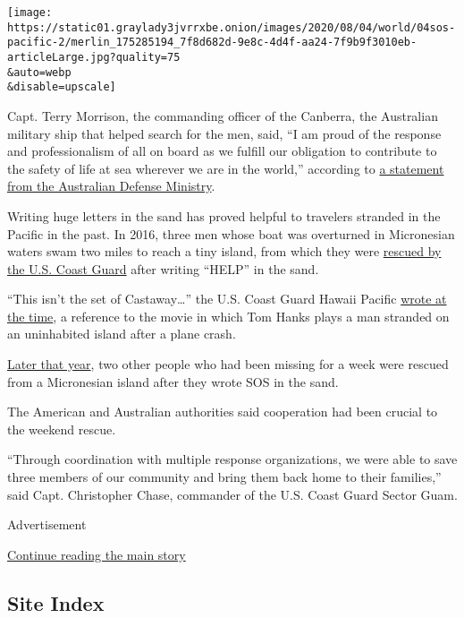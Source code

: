 \texttt{[image: https://static01.graylady3jvrrxbe.onion/images/2020/08/04/world/04sos-pacific-2/merlin\_175285194\_7f8d682d-9e8c-4d4f-aa24-7f9b9f3010eb-articleLarge.jpg?quality=75\\\&auto=webp\\\&disable=upscale]}

Capt. Terry Morrison, the commanding officer of the Canberra, the
Australian military ship that helped search for the men, said, ``I am
proud of the response and professionalism of all on board as we fulfill
our obligation to contribute to the safety of life at sea wherever we
are in the world,'' according to
\href{https://news.defence.gov.au/international/hmas-canberra-assists-search-and-rescue}{a
statement from the Australian Defense Ministry}.

Writing huge letters in the sand has proved helpful to travelers
stranded in the Pacific in the past. In 2016, three men whose boat was
overturned in Micronesian waters swam two miles to reach a tiny island,
from which they were
\href{https://twitter.com/USCGHawaiiPac/status/718703857837019137?ref_src=twsrc\%5Etfw\%7Ctwcamp\%5Etweetembed\%7Ctwterm\%5E718703857837019137\%7Ctwgr\%5E\&ref_url=https\%3A\%2F\%2Fwww.theguardian.com\%2Fus-news\%2F2016\%2Fapr\%2F09\%2Fmen-rescued-help-palm-leaves-island-pacific}{rescued
by the U.S. Coast Guard} after writing ``HELP'' in the sand.

``This isn't the set of Castaway\ldots{}'' the U.S. Coast Guard Hawaii
Pacific
\href{https://www.facebookcorewwwi.onion/USCG.Hawaii.Pacific/posts/986794331411733}{wrote
at the time}, a reference to the movie in which Tom Hanks plays a man
stranded on an uninhabited island after a plane crash.

\href{https://www.bbc.com/news/world-asia-37203796}{Later that year},
two other people who had been missing for a week were rescued from a
Micronesian island after they wrote SOS in the sand.

The American and Australian authorities said cooperation had been
crucial to the weekend rescue.

``Through coordination with multiple response organizations, we were
able to save three members of our community and bring them back home to
their families,'' said Capt. Christopher Chase, commander of the U.S.
Coast Guard Sector Guam.

Advertisement

\protect\hyperlink{after-bottom}{Continue reading the main story}

\hypertarget{site-index}{%
\subsection{Site Index}\label{site-index}}


